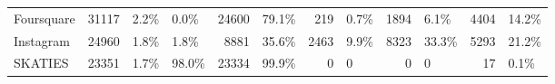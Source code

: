 \begin{tabular}{lrllrlrlrlrl}
Foursquare          &       31117 &        2.2\% &                 0.0\% &             24600 &             79.1\% &               219 &              0.7\% &              1894 &              6.1\% &             4404 &            14.2\% \\
Instagram           &       24960 &        1.8\% &                 1.8\% &              8881 &             35.6\% &              2463 &              9.9\% &              8323 &             33.3\% &             5293 &            21.2\% \\
SKATIES             &       23351 &        1.7\% &                98.0\% &             23334 &             99.9\% &                 0 &                 0 &                 0 &                 0 &               17 &             0.1\% \\
\bottomrule
\end{tabular}
